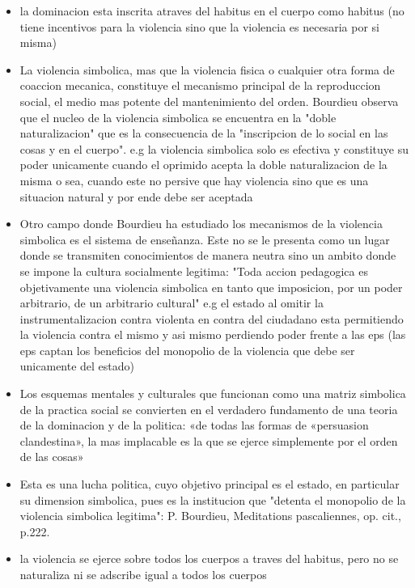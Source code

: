 \documentclass[11pt]{article}
\begin{document}
\begin{flushleft}
    \begin{snippet}
        \begin{itemize}
            \item la dominacion esta inscrita atraves del habitus en el cuerpo como habitus (no tiene incentivos para la violencia sino que la violencia es necesaria por si misma)
            \item La violencia simbolica, mas que la violencia fisica o cualquier otra forma de coaccion mecanica, constituye el mecanismo principal de la reproduccion social, el medio mas potente del mantenimiento del orden. Bourdieu observa que el nucleo de la violencia simbolica se encuentra en la "doble naturalizacion" que es la consecuencia de la "inscripcion de lo social en las cosas y en el cuerpo". e.g la violencia simbolica solo es efectiva y constituye su poder unicamente cuando el oprimido acepta la doble naturalizacion de la misma o sea, cuando este no persive que hay violencia sino que es una situacion natural y por ende debe ser aceptada
            \item Otro campo donde Bourdieu ha estudiado los mecanismos de la violencia simbolica es el sistema de enseñanza. Este no se le presenta como un lugar donde se transmiten conocimientos de manera neutra sino un ambito donde se impone la cultura socialmente legitima: "Toda accion pedagogica es objetivamente una violencia simbolica en tanto que imposicion, por un poder arbitrario, de un arbitrario cultural" e.g el estado al omitir la instrumentalizacion contra violenta en contra del ciudadano esta permitiendo la violencia contra el mismo y asi mismo perdiendo poder frente a las eps (las eps captan los beneficios del monopolio de la violencia que debe ser unicamente del estado)
            \item Los esquemas mentales y culturales que funcionan como una matriz simbolica de la practica social se convierten en el verdadero fundamento de una teoria de la dominacion y de la politica: «de todas las formas de «persuasion clandestina», la mas implacable es la que se ejerce simplemente por el orden de las cosas»
            \item Esta es una lucha politica, cuyo objetivo principal es el estado, en particular su dimension simbolica, pues es la institucion que "detenta el monopolio de la violencia simbolica legitima": P. Bourdieu, Meditations pascaliennes, op. cit., p.222.
            \item la violencia se ejerce sobre todos los cuerpos a traves del habitus, pero no se naturaliza ni se adscribe igual a todos los cuerpos

\end{itemize}
\end{snippet}
\end{flushleft}
\end{document}

